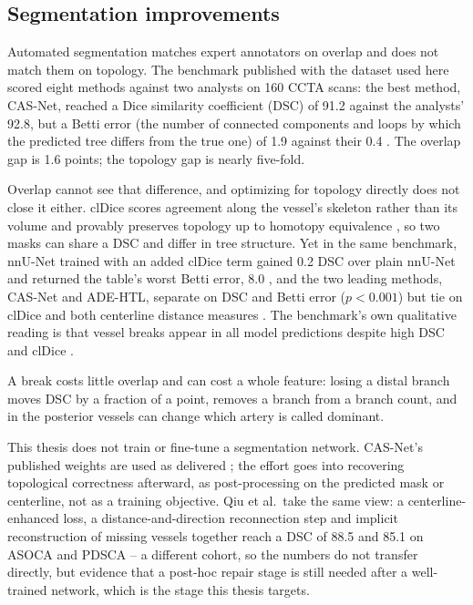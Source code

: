 
\subsection{Segmentation improvements}
\label{sec:gap-obtaining}

Automated segmentation matches expert annotators on overlap and does not match them on topology.
The benchmark published with the dataset used here scored eight methods against two analysts on 160
CCTA scans: the best method, CAS-Net, reached a Dice similarity coefficient (DSC) of 91.2 against the
analysts' 92.8, but a Betti error (the number of connected components and loops by which the
predicted tree differs from the true one) of 1.9 against their 0.4 \cite{bransby2026imagecasx,
dong2023casnet}. The overlap gap is 1.6 points; the topology gap is nearly five-fold.

Overlap cannot see that difference, and optimizing for topology directly does not close it either.
clDice scores agreement along the vessel's skeleton rather than its volume and provably preserves
topology up to homotopy equivalence \cite{shit2021cldice}, so two masks can share a DSC and differ in
tree structure. Yet in the same benchmark, nnU-Net trained with an added clDice term gained 0.2 DSC
over plain nnU-Net and returned the table's worst Betti error, 8.0 \cite{isensee2021nnunet}, and the
two leading methods, CAS-Net and ADE-HTL, separate on DSC and Betti error ($p<0.001$) but tie on
clDice and both centerline distance measures \cite{zhang2024adehtl}. The benchmark's own qualitative
reading is that vessel breaks appear in all model predictions despite high DSC and clDice
\cite{bransby2026imagecasx}.

A break costs little overlap and can cost a whole feature: losing a distal branch moves DSC by a
fraction of a point, removes a branch from a branch count, and in the posterior vessels can change
which artery is called dominant.

This thesis does not train or fine-tune a segmentation network. CAS-Net's published weights are used
as delivered \cite{bransby2026imagecasx}; the effort goes into recovering topological correctness
afterward, as post-processing on the predicted mask or centerline, not as a training objective. Qiu
et al.\ take the same view: a centerline-enhanced loss, a distance-and-direction reconnection step and
implicit reconstruction of missing vessels together reach a DSC of 88.5 and 85.1 on ASOCA and PDSCA
\cite{qiu2025topology} -- a different cohort, so the numbers do not transfer directly, but evidence
that a post-hoc repair stage is still needed after a well-trained network, which is the stage this
thesis targets.